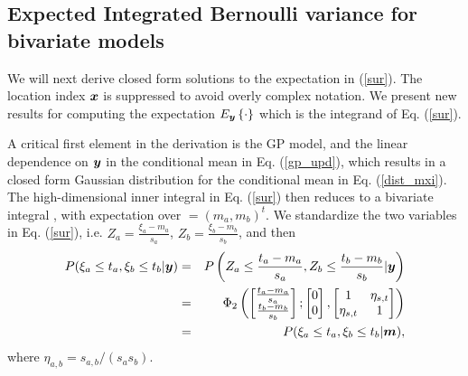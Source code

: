 \documentclass[aoas]{imsart}
\begin{document}
\subsection{Expected Integrated Bernoulli variance for bivariate models}

We will next derive closed form solutions to the expectation in
(\ref{sur}). The location index ${\boldsymbol x}$ is suppressed to avoid overly
complex notation. We present new results for computing the expectation
$E_{{\boldsymbol y}}\left\{ \cdot \right\}$ which is the integrand of
Eq. (\ref{sur}).

A critical first element in the derivation is the GP model, and the
linear dependence on ${\boldsymbol y}$ in the conditional mean in
Eq. (\ref{gp_upd}), which results in a closed form Gaussian
distribution for the conditional mean in Eq. (\ref{dist_mxi}). The
high-dimensional inner integral in Eq. (\ref{sur}) then reduces to a
bivariate integral \citep{bhattacharjya2013value, chevalier2014fast},
with expectation over $\bm=(m_{a},m_{b})^t$.  We standardize the two
variables in Eq. (\ref{sur}), i.e.  $Z_a=\frac{\xi_a-m_{a}}{s_{a}}$,
$Z_b=\frac{\xi_b-m_{b}}{s_{b}}$, and then
\begin{eqnarray}\label{ytom}
   P(\xi_a \leq t_a, \xi_b \leq t_b|\by) &=& P \left( Z_a \leq\frac{t_a-m_{a}}{s_{a}}, Z_b \leq\frac{t_b-m_{b}}{s_{b}}|\by \right) \nonumber \\
   &=& \Phi_2 \begin{pmatrix} 
\begin{bmatrix} \frac{t_a-m_{a}}{s_{a}}\\
\frac{t_b-m_{b}}{s_{b}}
\end{bmatrix};
 \begin{bmatrix} 0\\
0
\end{bmatrix},\begin{bmatrix}
1 & \eta_{s,t}  \\
\eta_{s,t}   & 1  
\end{bmatrix}\end{pmatrix} \nonumber \\
&=& P(\xi_a \leq t_a, \xi_b \leq t_b|\bm),
\end{eqnarray}
where $\eta_{a,b} =s_{a,b}/(s_{a} s_{b})$.
\end{document}
